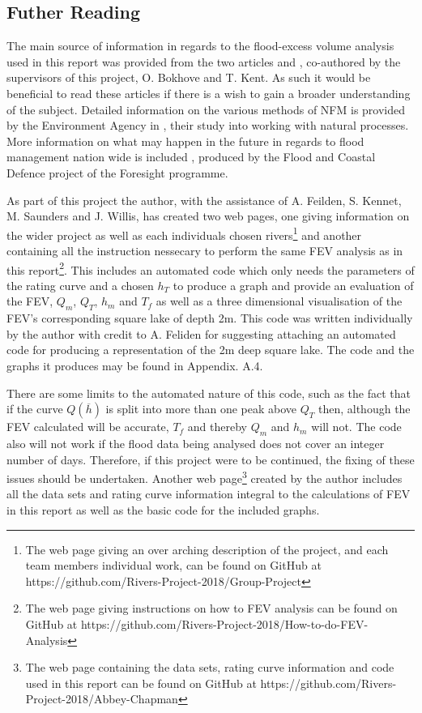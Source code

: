 \documentclass[11pt,a4paper]{article}
\begin{document}
\subsection{Futher Reading}
The main source of information in regards to the flood-excess volume analysis used in this report was provided from the two articles \cite{Aire} and \cite{Calder-Don}, co-authored by the supervisors of this project, O. Bokhove and T. Kent. As such it would be beneficial to read these articles if there is a wish to gain a broader understanding of the subject. Detailed information on the various methods of NFM is provided by the Environment Agency in \cite{nfm}, their study into working with natural processes. More information on what may happen in the future in regards to flood management nation wide is included \cite{foresight}, produced by the Flood and Coastal Defence project of the Foresight programme.

As part of this project the author, with the assistance of A. Feilden, S. Kennet, M. Saunders and J. Willis, has created two web pages, one giving information on the wider project as well as each individuals chosen rivers\footnote{The web page giving an over arching description of the project, and each team members individual work, can be found on GitHub at https://github.com/Rivers-Project-2018/Group-Project} and another containing all the instruction nessecary to perform the same FEV analysis as in this report\footnote{The web page giving instructions on how to FEV analysis can be found on GitHub at https://github.com/Rivers-Project-2018/How-to-do-FEV-Analysis}. This includes an automated code which only needs the parameters of the rating curve and a chosen $h_T$ to produce a graph and provide an evaluation of the FEV, $Q_m$, $Q_T$, $h_m$ and $T_f$ as well as a three dimensional visualisation of the FEV's corresponding square lake of depth 2m. This code was written individually by the author with credit to A. Feliden for suggesting attaching an automated code for producing a representation of the 2m deep square lake. The code and the graphs it produces may be found in Appendix. A.4. 

There are some limits to the automated nature of this code, such as the fact that if the curve $Q(\overline{h})$ is split into more than one peak above $Q_T$ then, although the FEV calculated will be accurate, $T_f$ and thereby $Q_m$ and $h_m$ will not. The code also will not work if the flood data being analysed does not cover an integer number of days. Therefore, if this project were to be continued, the fixing of these issues should be undertaken. Another web page\footnote{The web page containing the data sets, rating curve information and code used in this report can be found on GitHub at https://github.com/Rivers-Project-2018/Abbey-Chapman} created by the author includes all the data sets and rating curve information integral to the calculations of FEV in this report as well as the basic code for the included graphs.
\end{document}
